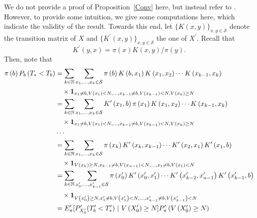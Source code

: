 We do not provide a proof of Proposition~\ref{Conv} here, but instead refer
to \citet{Blanchet2013}. However, to provide some intuition, we give some
computations here, which indicate the validity of the result. Towards this
end, let $\{K(x,y)\}_{x,y\in \mathcal{S}}$ denote the transition matrix of $X
$ and $\{K^{\prime }(x,y)\}_{x,y\in \mathcal{S}}$ the one of $X^{\prime }$.
Recall that
\begin{equation*}
K^{\prime }\left( y,x\right) =\pi \left( x\right) K\left( x,y\right) /\pi
\left( y\right) .
\end{equation*}%
Then, note that
\begin{align*}
\pi \left( b\right) P_{b}\left( T_{\ast }<T_{b}\right) & =\sum_{k\in \mathbb{%
N}}\sum_{x_{1},\ldots ,x_{k}\in \mathcal{S}}\pi \left( b\right) K\left(
b,x_{1}\right) K\left( x_{1},x_{2}\right) \cdots K\left(
x_{k-1},x_{k}\right)  \\
& \quad \times \mathbf{1}_{x_{1}\neq b,V\left( x_{1}\right) <N,\ldots
,x_{k-1}\neq b,V\left( x_{k-1}\right) <N,V\left( x_{k}\right) \geq N} \\
& =\sum_{k\in \mathbb{N}}\sum_{x_{1},\ldots ,x_{k}\in \mathcal{S}}K^{\prime
}\left( x_{1},b\right) \pi \left( x_{1}\right) K\left( x_{1},x_{2}\right)
\cdots K\left( x_{k-1},x_{k}\right)  \\
& \quad \times \mathbf{1}_{x_{1}\neq b,V\left( x_{1}\right) <N,\ldots
,x_{k-1}\neq b,V\left( x_{k-1}\right) <N,V\left( x_{k}\right) \geq N} \\
& \cdots  \\
& =\sum_{k\in \mathbb{N}}\sum_{x_{1},\ldots ,x_{k}\in \mathcal{S}}\pi \left(
x_{k}\right) K^{\prime }\left( x_{k},x_{k-1}\right) \cdots K^{\prime }\left(
x_{2},x_{1}\right) K^{\prime }\left( x_{1},b\right)  \\
& \quad \times \mathbf{1}_{V\left( x_{k}\right) \geq N,x_{k-1}\neq b,V\left(
x_{n-1}\right) <N,\ldots ,x_{1}\neq b,V\left( x_{1}\right) <N} \\
& =\sum_{k\in \mathbb{N}}\sum_{x_{0}^{\prime },\ldots ,x_{k-1}^{\prime }\in
\mathcal{S}}\pi \left( x_{0}^{\prime }\right) K^{\prime }\left(
x_{0}^{\prime },x_{1}^{\prime }\right) \cdots K^{\prime }\left(
x_{k-2}^{\prime },x_{n-1}^{\prime }\right) K^{\prime }\left( x_{k-1}^{\prime
},b\right)  \\
& \quad \times \mathbf{1}_{V\left( x_{0}^{\prime }\right) \geq
N,x_{1}^{\prime }\neq b,V\left( x_{1}^{\prime }\right) <N,\ldots
,x_{k-1}^{\prime }\neq b,V\left( x_{k-1}^{\prime }\right) <N} \\
& =E_{\pi }^{\prime }[P_{X_{0}^{\prime }}^{\prime }(T_{b}^{\prime }<T_{\ast
}^{\prime })\text{ }|\text{ }V\left( X_{0}^{\prime }\right) \geq N]P_{\pi
}^{\prime }\left( V\left( X_{0}^{\prime }\right) \geq N\right)
\end{align*}%
